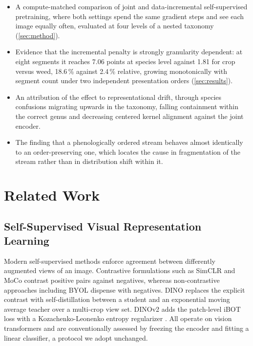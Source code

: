 \documentclass[english]{lni}
\begin{document}
\begin{itemize}[nosep]
  \item A compute-matched comparison of joint and data-incremental self-supervised pretraining, where both settings spend the same gradient steps and see each image equally often, evaluated at four levels of a nested taxonomy (\cref{sec:method}).
  \item Evidence that the incremental penalty is strongly granularity dependent: at eight segments it reaches 7.06 points at species level against 1.81 for crop versus weed, \ie{} 18.6\,\% against 2.4\,\% relative, growing monotonically with segment count under two independent presentation orders (\cref{sec:results}).
  \item An attribution of the effect to representational drift, through species confusions migrating upwards in the taxonomy, falling containment within the correct genus and decreasing centered kernel alignment against the joint encoder.
  \item The finding that a phenologically ordered stream behaves almost identically to an order-preserving one, which locates the cause in fragmentation of the stream rather than in distribution shift within it.
\end{itemize}

\section{Related Work}\label{sec:related-work}

\subsection{Self-Supervised Visual Representation Learning}

Modern self-supervised methods enforce agreement between differently augmented views of an image. Contrastive formulations such as SimCLR \cite{Chen2020} and MoCo contrast positive pairs against negatives, whereas non-contrastive approaches including BYOL dispense with negatives. DINO \cite{Caron2021} replaces the explicit contrast with self-distillation between a student and an exponential moving average teacher over a multi-crop view set. DINOv2 \cite{Oquab2024} adds the patch-level iBOT loss \cite{Zhou2022} with a Kozachenko-Leonenko entropy regularizer \cite{Sablayrolles2019}. All operate on vision transformers \cite{Dosovitskiy2021} and are conventionally assessed by freezing the encoder and fitting a linear classifier, a protocol we adopt unchanged.
\end{document}

